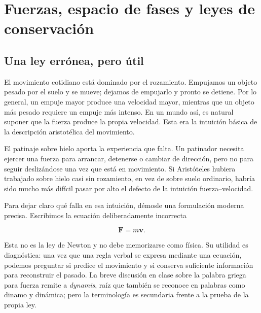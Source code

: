 \chapter{Fuerzas, espacio de fases y leyes de conservación}


\section{Una ley errónea, pero útil}

El movimiento cotidiano está dominado por el rozamiento. Empujamos un objeto pesado por el suelo y se mueve; dejamos de empujarlo y pronto se detiene. Por lo general, un empuje mayor produce una velocidad mayor, mientras que un objeto más pesado requiere un empuje más intenso. En un mundo así, es natural suponer que la fuerza produce la propia velocidad. Esta era la intuición básica de la descripción aristotélica del movimiento.

El patinaje sobre hielo aporta la experiencia que falta. Un patinador necesita ejercer una fuerza para arrancar, detenerse o cambiar de dirección, pero no para seguir deslizándose una vez que está en movimiento. Si Aristóteles hubiera trabajado sobre hielo casi sin rozamiento, en vez de sobre suelo ordinario, habría sido mucho más difícil pasar por alto el defecto de la intuición fuerza--velocidad.

Para dejar claro qué falla en esa intuición, démosle una formulación moderna precisa. Escribimos la ecuación deliberadamente incorrecta

\begin{equation}
  \mathbf F=m\mathbf v.
  \label{eq:aristotle-vector-law}
\end{equation}

Esta no es la ley de Newton y no debe memorizarse como física. Su utilidad es diagnóstica: una vez que una regla verbal se expresa mediante una ecuación, podemos preguntar si predice el movimiento y si conserva suficiente información para reconstruir el pasado. La breve discusión en clase sobre la palabra griega para fuerza remite a \emph{dynamis}, raíz que también se reconoce en palabras como dinamo y dinámica; pero la terminología es secundaria frente a la prueba de la propia ley.

